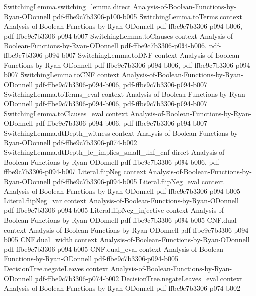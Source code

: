 \begin{lemma}
\proofstep
  {SwitchingLemma.switching_lemma}
  {direct}
  {Analysis-of-Boolean-Functions-by-Ryan-ODonnell}
  {pdf-ffbe9c7b3306-p100-b005}
\proofstep
  {SwitchingLemma.toTerms}
  {context}
  {Analysis-of-Boolean-Functions-by-Ryan-ODonnell}
  {pdf-ffbe9c7b3306-p094-b006,
    pdf-ffbe9c7b3306-p094-b007}
\proofstep
  {SwitchingLemma.toClauses}
  {context}
  {Analysis-of-Boolean-Functions-by-Ryan-ODonnell}
  {pdf-ffbe9c7b3306-p094-b006,
    pdf-ffbe9c7b3306-p094-b007}
\proofstep
  {SwitchingLemma.toDNF}
  {context}
  {Analysis-of-Boolean-Functions-by-Ryan-ODonnell}
  {pdf-ffbe9c7b3306-p094-b006,
    pdf-ffbe9c7b3306-p094-b007}
\proofstep
  {SwitchingLemma.toCNF}
  {context}
  {Analysis-of-Boolean-Functions-by-Ryan-ODonnell}
  {pdf-ffbe9c7b3306-p094-b006,
    pdf-ffbe9c7b3306-p094-b007}
\proofstep
  {SwitchingLemma.toTerms_eval}
  {context}
  {Analysis-of-Boolean-Functions-by-Ryan-ODonnell}
  {pdf-ffbe9c7b3306-p094-b006,
    pdf-ffbe9c7b3306-p094-b007}
\proofstep
  {SwitchingLemma.toClauses_eval}
  {context}
  {Analysis-of-Boolean-Functions-by-Ryan-ODonnell}
  {pdf-ffbe9c7b3306-p094-b006,
    pdf-ffbe9c7b3306-p094-b007}
\proofstep
  {SwitchingLemma.dtDepth_witness}
  {context}
  {Analysis-of-Boolean-Functions-by-Ryan-ODonnell}
  {pdf-ffbe9c7b3306-p074-b002}
\proofstep
  {SwitchingLemma.dtDepth_le_implies_small_dnf_cnf}
  {direct}
  {Analysis-of-Boolean-Functions-by-Ryan-ODonnell}
  {pdf-ffbe9c7b3306-p094-b006,
    pdf-ffbe9c7b3306-p094-b007}
\proofstep
  {Literal.flipNeg}
  {context}
  {Analysis-of-Boolean-Functions-by-Ryan-ODonnell}
  {pdf-ffbe9c7b3306-p094-b005}
\proofstep
  {Literal.flipNeg_eval}
  {context}
  {Analysis-of-Boolean-Functions-by-Ryan-ODonnell}
  {pdf-ffbe9c7b3306-p094-b005}
\proofstep
  {Literal.flipNeg_var}
  {context}
  {Analysis-of-Boolean-Functions-by-Ryan-ODonnell}
  {pdf-ffbe9c7b3306-p094-b005}
\proofstep
  {Literal.flipNeg_injective}
  {context}
  {Analysis-of-Boolean-Functions-by-Ryan-ODonnell}
  {pdf-ffbe9c7b3306-p094-b005}
\proofstep
  {CNF.dual}
  {context}
  {Analysis-of-Boolean-Functions-by-Ryan-ODonnell}
  {pdf-ffbe9c7b3306-p094-b005}
\proofstep
  {CNF.dual_width}
  {context}
  {Analysis-of-Boolean-Functions-by-Ryan-ODonnell}
  {pdf-ffbe9c7b3306-p094-b005}
\proofstep
  {CNF.dual_eval}
  {context}
  {Analysis-of-Boolean-Functions-by-Ryan-ODonnell}
  {pdf-ffbe9c7b3306-p094-b005}
\proofstep
  {DecisionTree.negateLeaves}
  {context}
  {Analysis-of-Boolean-Functions-by-Ryan-ODonnell}
  {pdf-ffbe9c7b3306-p074-b002}
\proofstep
  {DecisionTree.negateLeaves_eval}
  {context}
  {Analysis-of-Boolean-Functions-by-Ryan-ODonnell}
  {pdf-ffbe9c7b3306-p074-b002}

\end{lemma}
